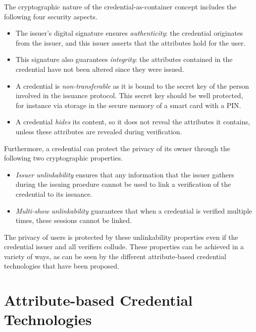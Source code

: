 The cryptographic nature of the credential-as-container concept includes the
following four security aspects.
\begin{itemize}
  \item The issuer's digital signature ensures \emph{authenticity}:
     the credential originates from the issuer, and this
    issuer asserts that the attributes hold for the user.
  \item This signature also guarantees \emph{integrity}:  the
    attributes contained in the credential have not been altered since they were
    issued.
  \item A credential is \emph{non-transferable} as
    it is bound to the secret key of the person involved in the issuance
    protocol. This secret key should be well protected, for instance via storage
    in the secure memory of a smart card with a PIN.
  \item A credential \emph{hides} its content, so it does not
    reveal the attributes it contains, unless these attributes are revealed
    during verification.
\end{itemize}
Furthermore, a credential can protect the privacy of its owner
through the following two cryptographic properties.
\begin{itemize}
  \item \emph{Issuer unlinkability}
     ensures that any
    information that the issuer gathers during the issuing proedure cannot be 
    used to link a verification of the credential to its issuance.
  \item \emph{Multi-show unlinkability}
     guarantees
    that when a credential is verified multiple times, these sessions cannot be
    linked.
\end{itemize}
The privacy of users is protected by these unlinkability properties even if the
credential issuer and all verifiers collude. These properties can
be achieved in a variety of ways, as can be seen by the different
attribute-based credential technologies that have been proposed.

\section{Attribute-based Credential Technologies}

